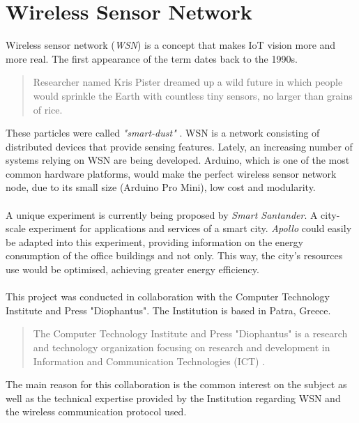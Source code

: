 \documentclass[12pt,a4paper]{report}
\begin{document}
\section{Wireless Sensor Network}
%
Wireless sensor network (\textit{WSN}) is a concept that makes IoT vision more and more real.
The first appearance of the term dates back to the 1990s.
\begin{quote}
    Researcher named Kris Pister dreamed up a wild future in which people would sprinkle the Earth with countless tiny sensors, no larger than grains of rice. \cite{website:smartdust} 
\end{quote}
%
These particles were called \textit{"smart-dust"} \cite{website:smartdust}.
WSN is a network consisting of distributed devices that provide sensing features.
Lately, an increasing number of systems relying on WSN are being developed.
Arduino, which is one of the most common hardware platforms, would make the perfect wireless sensor network node, due to its small size (Arduino Pro Mini), low cost and modularity.\\
\ \\
A unique experiment is currently being proposed by \textit{Smart Santander}.
A city-scale experiment for applications and services of a smart city.
\emph{Apollo} could easily be adapted into this experiment, providing information on the energy consumption of the office buildings and not only.
This way, the city's resources use would be optimised, achieving greater energy efficiency.\\
\ \\
%
This project was conducted in collaboration with the Computer Technology Institute and Press "Diophantus". The Institution is based in Patra, Greece.
%
\begin{quote}
	The Computer Technology Institute and Press "Diophantus" is a research and technology organization focusing on research and development in Information and Communication Technologies (ICT) \cite{website:cti}.
\end{quote}
%
The main reason for this collaboration is the common interest on the subject as well as the technical expertise provided by the Institution regarding WSN and the wireless communication protocol used.
%
\newpage
%
\end{document}
